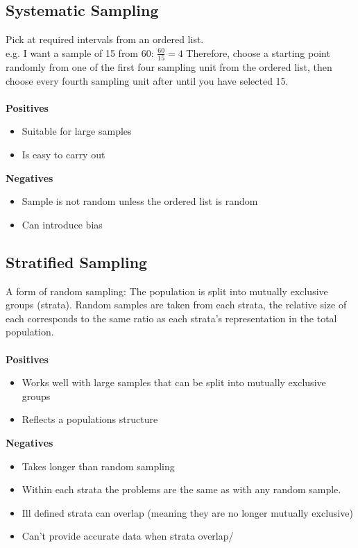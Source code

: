 \documentclass{article}
\begin{document}
\begin{description}
		\subsection{Systematic Sampling}
			Pick at required intervals from an ordered list.\\
			e.g. I want a sample of 15 from 60: $\frac{60}{15} = 4$ Therefore, choose a starting point randomly from one of the first four sampling unit from the ordered list, then choose every fourth sampling unit after until you have selected 15. \\\\
			\textbf{Positives}
                        \begin{itemize}
				\item Suitable for large samples
				\item Is easy to carry out
                        \end{itemize}
                        \textbf{Negatives}
                        \begin{itemize}
                        	\item Sample is not random unless the ordered list is random
				\item Can introduce bias
                        \end{itemize}
		\subsection{Stratified Sampling}
			A form of random sampling: The population is split into mutually exclusive groups (strata). Random samples are taken from each strata, the relative size of each corresponds to the same ratio as each strata's representation in the total population. \\\\
			\textbf{Positives}
                        \begin{itemize}
				\item Works well with large samples that can be split into mutually exclusive groups
				\item Reflects a populations structure
                        \end{itemize}
                        \textbf{Negatives}
                        \begin{itemize}
                        	\item Takes longer than random sampling
				\item Within each strata the problems are the same as with any random sample.
				\item Ill defined strata can overlap (meaning they are no longer mutually exclusive)
				\item Can't provide accurate data when strata overlap/
                        \end{itemize}

\end{description}
\end{document}

